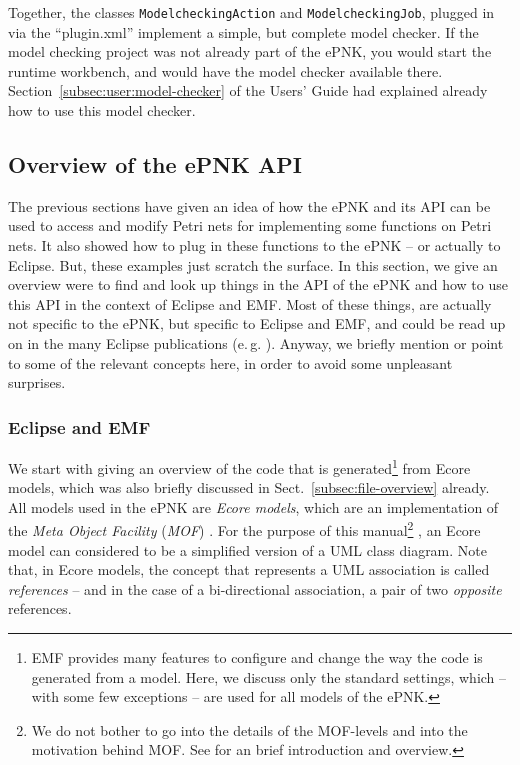 Together, the classes {\tt ModelcheckingAction} and {\tt ModelcheckingJob},
plugged in via the ``plugin.xml'' implement a simple, but complete model
checker. If the model checking project was not already part of the ePNK, you
would start the runtime workbench, and would have the model checker
available there.  Section~\ref{subsec:user:model-checker} of the
Users' Guide had explained already how to use this model checker.%

\subsection{Overview of the ePNK API}
\label{subsec:devloper:functitions:utilities}

The previous sections have given an idea of how the ePNK and its
API can be used to access and modify Petri nets for implementing some
functions on Petri nets. It also showed how to plug in these functions
to the ePNK -- or actually to Eclipse. But, these examples just scratch
the surface. In this section, we give an overview were to find and look
up things in the API of the ePNK and how to use this API in the context
of Eclipse and EMF. Most of these things, are actually not specific to
the ePNK, but specific to Eclipse and EMF, and could be read up on
in the many Eclipse publications (e.\,g. \cite{BSM06,ClRu08,Gro09}).
Anyway, we briefly mention or point to some of the relevant concepts
here, in order to avoid some unpleasant surprises.

\subsubsection{Eclipse and EMF}
\label{subsubsec:ePNK:API:EMF}

We start with giving an overview of the code that is generated\footnote
  {EMF provides many features to configure and change the way the code
   is generated from a model. Here, we discuss only the standard settings,
   which -- with some few exceptions -- are used for all models of the ePNK.}
from Ecore models, which was also briefly discussed in
Sect.~\ref{subsec:file-overview} already. All models used in the ePNK are
\emph{Ecore models},%
which are an implementation of the \emph{Meta Object Facility} (\emph{MOF})
\cite{MOF05}. For the purpose of this manual\footnote {We do not bother to go into the details of the MOF-levels and into the
   motivation behind MOF. See \cite{Kin09c} for an brief introduction and
   overview.}%
, an Ecore model can considered to be a simplified version of a UML class
diagram. Note that, in Ecore models, the concept that represents a UML
association is called \emph{references}%
-- and in the case of a bi-directional association, a pair of two
\emph{opposite} references.


